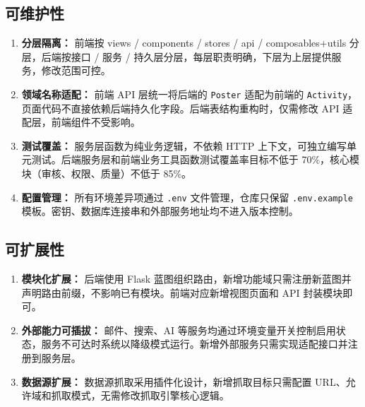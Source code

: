 \documentclass[12pt,a4paper]{ctexart}
\begin{document}
\subsection{可维护性}
\begin{enumerate}
\item \textbf{分层隔离：} 前端按 views / components / stores / api / composables+utils 分层，后端按接口 / 服务 / 持久层分层，每层职责明确，下层为上层提供服务，修改范围可控。
\item \textbf{领域名称适配：} 前端 API 层统一将后端的 \texttt{Poster} 适配为前端的 \texttt{Activity}，页面代码不直接依赖后端持久化字段。后端表结构重构时，仅需修改 API 适配层，前端组件不受影响。
\item \textbf{测试覆盖：} 服务层函数为纯业务逻辑，不依赖 HTTP 上下文，可独立编写单元测试。后端服务层和前端业务工具函数测试覆盖率目标不低于 70\%，核心模块（审核、权限、质量）不低于 85\%。
\item \textbf{配置管理：} 所有环境差异项通过 \texttt{.env} 文件管理，仓库只保留 \texttt{.env.example} 模板。密钥、数据库连接串和外部服务地址均不进入版本控制。
\end{enumerate}

\subsection{可扩展性}
\begin{enumerate}
\item \textbf{模块化扩展：} 后端使用 Flask 蓝图组织路由，新增功能域只需注册新蓝图并声明路由前缀，不影响已有模块。前端对应新增视图页面和 API 封装模块即可。
\item \textbf{外部能力可插拔：} 邮件、搜索、AI 等服务均通过环境变量开关控制启用状态，服务不可达时系统以降级模式运行。新增外部服务只需实现适配接口并注册到服务层。
\item \textbf{数据源扩展：} 数据源抓取采用插件化设计，新增抓取目标只需配置 URL、允许域和抓取模式，无需修改抓取引擎核心逻辑。
\end{enumerate}
\end{document}
